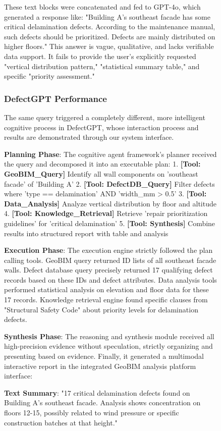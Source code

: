 \begin{figure}[htbp]
These text blocks were concatenated and fed to GPT-4o, which generated a response like: "Building A's southeast facade has some critical delamination defects. According to the maintenance manual, such defects should be prioritized. Defects are mainly distributed on higher floors." This answer is vague, qualitative, and lacks verifiable data support. It fails to provide the user's explicitly requested "vertical distribution pattern," "statistical summary table," and specific "priority assessment."

\subsubsection{DefectGPT Performance}

The same query triggered a completely different, more intelligent cognitive process in DefectGPT, whose interaction process and results are demonstrated through our system interface.

\textbf{Planning Phase}: The cognitive agent framework's planner received the query and decomposed it into an executable plan:
1. \textbf{[Tool: GeoBIM\_Query]} Identify all wall components on 'southeast facade' of 'Building A'
2. \textbf{[Tool: DefectDB\_Query]} Filter defects where 'type == delamination' AND 'width\_mm > 0.5'
3. \textbf{[Tool: Data\_Analysis]} Analyze vertical distribution by floor and altitude
4. \textbf{[Tool: Knowledge\_Retrieval]} Retrieve 'repair prioritization guidelines' for 'critical delamination'
5. \textbf{[Tool: Synthesis]} Combine results into structured report with table and analysis

\textbf{Execution Phase}: The execution engine strictly followed the plan calling tools. GeoBIM query returned ID lists of all southeast facade walls. Defect database query precisely returned 17 qualifying defect records based on these IDs and defect attributes. Data analysis tools performed statistical analysis on elevation and floor data for these 17 records. Knowledge retrieval engine found specific clauses from "Structural Safety Code" about priority levels for delamination defects.

\textbf{Synthesis Phase}: The reasoning and synthesis module received all high-precision evidence without speculation, strictly organizing and presenting based on evidence. Finally, it generated a multimodal interactive report in the integrated GeoBIM analysis platform interface:

\textbf{Text Summary}: "17 critical delamination defects found on Building A's southeast facade. Analysis shows concentration on floors 12-15, possibly related to wind pressure or specific construction batches at that height."


\end{figure}
